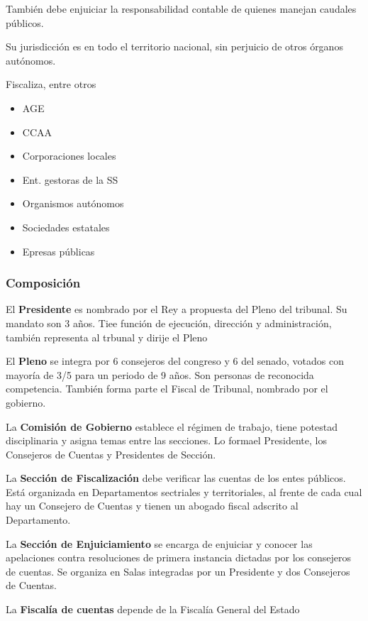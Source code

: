         También debe enjuiciar la responsabilidad contable de quienes manejan caudales públicos.

        Su jurisdicción es en todo el territorio nacional, sin perjuicio de otros órganos autónomos.

        Fiscaliza, entre otros
        \begin{itemize}
            \item AGE
            \item CCAA
            \item Corporaciones locales
            \item Ent. gestoras de la SS
            \item Organismos autónomos
            \item Sociedades estatales
            \item Epresas públicas
        \end{itemize}
    \subsubsection{Composición}
        El \textbf{Presidente} es nombrado por el Rey a propuesta del Pleno del tribunal. Su mandato son 3 años. Tiee función de ejecución, dirección y administración, también representa al trbunal y dirije el Pleno

        El \textbf{Pleno} se integra por 6 consejeros del congreso y 6 del senado, votados con mayoría de 3/5 para un periodo de 9 años. Son personas de reconocida competencia. También forma parte el Fiscal de Tribunal, nombrado por el gobierno.

        La \textbf{Comisión de Gobierno} establece el régimen de trabajo, tiene potestad disciplinaria y asigna temas entre las secciones. Lo formael Presidente, los Consejeros de Cuentas y Presidentes de Sección.

        La \textbf{Sección de Fiscalización} debe verificar las cuentas de los entes públicos. Está organizada en Departamentos sectriales y territoriales, al frente de cada cual hay un Consejero de Cuentas y tienen un abogado fiscal adscrito al Departamento.

        La \textbf{Sección de Enjuiciamiento} se encarga de enjuiciar y conocer las apelaciones contra resoluciones de primera instancia dictadas por los consejeros de cuentas. Se organiza en Salas integradas por un Presidente y dos Consejeros de Cuentas.

        La \textbf{Fiscalía de cuentas} depende de la Fiscalía General del Estado

